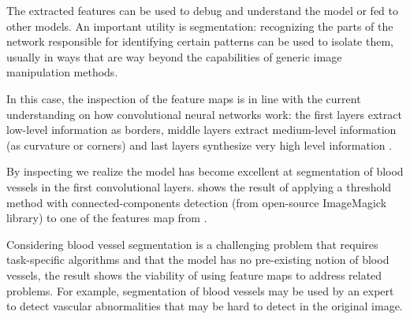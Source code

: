 The extracted features can be used to debug and understand the model or fed to other models. An important utility is segmentation: recognizing the parts of the network responsible for identifying certain patterns can be used to isolate them, usually in ways that are way beyond the capabilities of generic image manipulation methods.

In this case, the inspection of the feature maps is in line with the current understanding on how convolutional neural networks work: the first layers extract low-level information as borders, middle layers extract medium-level information (as curvature or corners) and last layers synthesize very high level information \cite{zeiler2014visualizing}.

By inspecting  we realize the model has become excellent at segmentation of blood vessels in the first convolutional layers.  shows the result of applying a threshold method with connected-components detection (from open-source ImageMagick library) to one of the features map from . 

Considering blood vessel segmentation is a challenging problem that requires task-specific algorithms and that the model has no pre-existing notion of blood vessels, the result shows the viability of using feature maps to address related problems. For example, segmentation of blood vessels may be used by an expert to detect vascular abnormalities that may be hard to detect in the original image.

